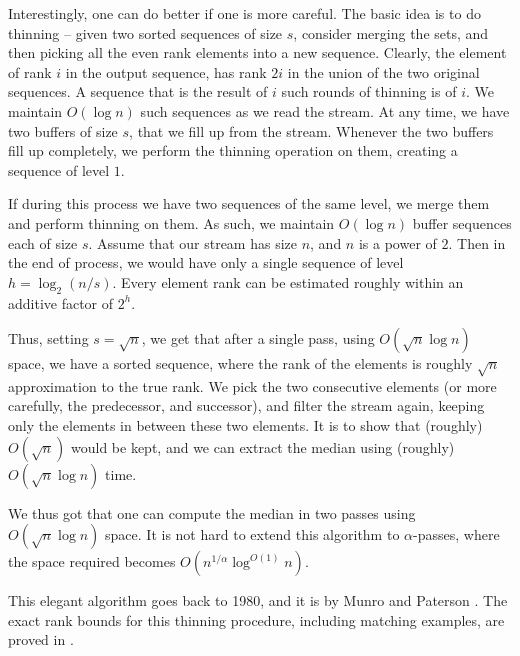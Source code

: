 \begin{remark}
    Interestingly, one can do better if one is more careful. The basic
    idea is to do thinning -- given two sorted sequences of size $s$,
    consider merging the sets, and then picking all the even rank
    elements into a new sequence. Clearly, the element of rank $i$ in
    the output sequence, has rank $2i$ in the union of the two
    original sequences. A sequence that is the result of $i$ such
    rounds of thinning is of  $i$. We maintain
    $O( \log n)$ such sequences as we read the stream. At any time, we
    have two buffers of size $s$, that we fill up from the
    stream. Whenever the two buffers fill up completely, we perform
    the thinning operation on them, creating a sequence of level $1$.

    If during this process we have two sequences of the same level, we
    merge them and perform thinning on them. As such, we maintain
    $O( \log n)$ buffer sequences each of size $s$. Assume that our
    stream has size $n$, and $n$ is a power of $2$. Then in the end of
    process, we would have only a single sequence of level
    $h = \log_2(n/s)$. Every element rank can be estimated roughly within
    an additive factor of $2^h$.

    Thus, setting $s=\sqrt{n}$, we get that after a single pass, using
    $O( \sqrt{n} \log n)$ space, we have a sorted sequence, where the
    rank of the elements is roughly $\sqrt{n}$ approximation to the
    true rank. We pick the two consecutive elements (or more
    carefully, the predecessor, and successor), and filter the stream
    again, keeping only the elements in between these two elements. It
    is to show that (roughly) $O( \sqrt{n})$ would be kept, and we can extract
    the median using (roughly) $O( \sqrt{n} \log n)$ time.

    We thus got that one can compute the median in two passes using
    $O(\sqrt{n} \log n)$ space. It is not hard to extend this
    algorithm to $\alpha$-passes, where the space required becomes
    $O(n^{1/\alpha} \log^{O(1)} n)$.

    This elegant algorithm goes back to 1980, and it is by Munro and
    Paterson \cite{mp-ssls-80}.
    The exact rank bounds for this thinning procedure, including matching
    examples, are proved in .
\end{remark}


